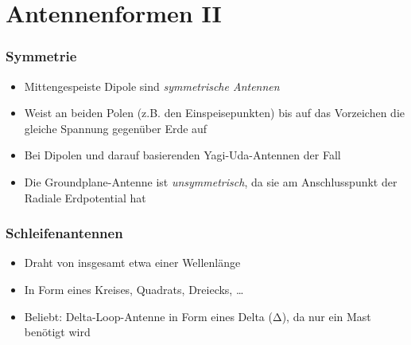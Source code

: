 
\section{Antennenformen II}
\label{section:antennenformen_2}
\begin{frame}%

\frametitle{Symmetrie}
\begin{itemize}
  \item Mittengespeiste Dipole sind \emph{symmetrische Antennen}
  \item Weist an beiden Polen (z.B. den Einspeisepunkten) bis auf das Vorzeichen die gleiche Spannung gegenüber Erde auf
  \item Bei Dipolen und darauf basierenden Yagi-Uda-Antennen der Fall
  \item Die Groundplane-Antenne ist \emph{unsymmetrisch}, da sie am Anschlusspunkt der Radiale Erdpotential hat
  \end{itemize}

\end{frame}

\begin{frame}
\end{frame}

\begin{frame}
\frametitle{Schleifenantennen}
\begin{itemize}
  \item Draht von insgesamt etwa einer Wellenlänge
  \item In Form eines Kreises, Quadrats, Dreiecks, …
  \item Beliebt: Delta-Loop-Antenne in Form eines Delta (Δ), da nur ein Mast benötigt wird
  \end{itemize}
\end{frame}


